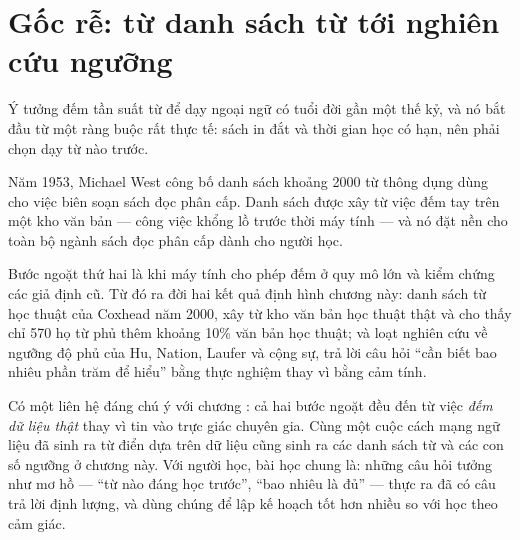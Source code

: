 \documentclass[../../english.tex]{subfiles}
\begin{document}
\section{Gốc rễ: từ danh sách từ tới nghiên cứu ngưỡng}

Ý tưởng đếm tần suất từ để dạy ngoại ngữ có tuổi đời gần một thế kỷ, và nó bắt đầu từ một ràng buộc rất thực tế: sách in đắt và thời gian học có hạn, nên phải chọn dạy từ nào trước.

Năm 1953, Michael West công bố danh sách khoảng 2000 từ thông dụng dùng cho việc biên soạn sách đọc phân cấp\cite{west1953}. Danh sách được xây từ việc đếm tay trên một kho văn bản --- công việc khổng lồ trước thời máy tính --- và nó đặt nền cho toàn bộ ngành sách đọc phân cấp dành cho người học.

Bước ngoặt thứ hai là khi máy tính cho phép đếm ở quy mô lớn và kiểm chứng các giả định cũ. Từ đó ra đời hai kết quả định hình chương này: danh sách từ học thuật của Coxhead năm 2000, xây từ kho văn bản học thuật thật và cho thấy chỉ 570 họ từ phủ thêm khoảng 10\% văn bản học thuật\cite{coxhead2000}; và loạt nghiên cứu về ngưỡng độ phủ của Hu, Nation, Laufer và cộng sự, trả lời câu hỏi ``cần biết bao nhiêu phần trăm để hiểu'' bằng thực nghiệm thay vì bằng cảm tính\cite{hunation2000,laufer2010,nation2006}.

Có một liên hệ đáng chú ý với chương : cả hai bước ngoặt đều đến từ việc \emph{đếm dữ liệu thật} thay vì tin vào trực giác chuyên gia. Cùng một cuộc cách mạng ngữ liệu đã sinh ra từ điển dựa trên dữ liệu cũng sinh ra các danh sách từ và các con số ngưỡng ở chương này. Với người học, bài học chung là: những câu hỏi tưởng như mơ hồ --- ``từ nào đáng học trước'', ``bao nhiêu là đủ'' --- thực ra đã có câu trả lời định lượng, và dùng chúng để lập kế hoạch tốt hơn nhiều so với học theo cảm giác.

\begin{gocre}
\end{gocre}
\end{document}
